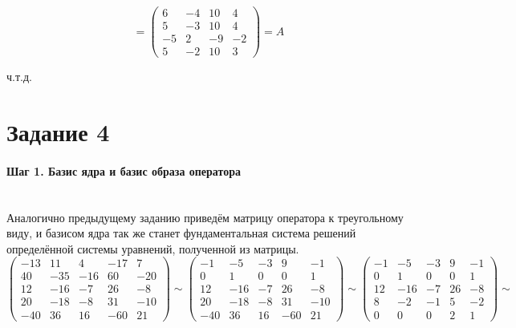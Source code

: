 \documentclass{article}
\begin{document}
$$= \begin{pmatrix}
6 & -4 & 10 & 4 \\
5 & -3 & 10 & 4 \\
-5 & 2 & -9 & -2 \\
5 & -2 & 10 & 3
\end{pmatrix} = A$$\begin{flushright}ч.т.д.\end{flushright}

\section*{Задание 4}
\paragraph*{Шаг 1. Базис ядра и базис образа оператора} \, \\
Аналогично предыдущему заданию приведём матрицу оператора к треугольному виду, и базисом ядра так же станет фундаментальная система решений определённой системы уравнений, полученной из матрицы.
$$\begin{pmatrix}
-13 & 11 & 4 & -17 & 7 \\
40 & -35 & -16 & 60 & -20 \\
12 & -16 & -7 & 26 & -8 \\
20 & -18 & -8 & 31 & -10 \\
-40 & 36 & 16 & -60 & 21
\end{pmatrix} \sim \begin{pmatrix}
-1 & -5 & -3 & 9 & -1 \\
0 & 1 & 0 & 0 & 1 \\
12 & -16 & -7 & 26 & -8 \\
20 & -18 & -8 & 31 & -10 \\
-40 & 36 & 16 & -60 & 21
\end{pmatrix} \sim \begin{pmatrix}
-1 & -5 & -3 & 9 & -1 \\
0 & 1 & 0 & 0 & 1 \\
12 & -16 & -7 & 26 & -8 \\
8 & -2 & -1 & 5 & -2 \\
0 & 0 & 0 & 2 & 1
\end{pmatrix} \sim $$
\end{document}
